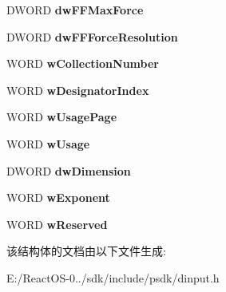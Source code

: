 \begin{DoxyCompactItemize}
D\+W\+O\+RD {\bfseries dw\+F\+F\+Max\+Force}
\item 
\mbox{\label{struct_d_i_d_e_v_i_c_e_o_b_j_e_c_t_i_n_s_t_a_n_c_e_w_a66ff7820923b0b9bd4690c436dd96df4}} 
D\+W\+O\+RD {\bfseries dw\+F\+F\+Force\+Resolution}
\item 
\mbox{\label{struct_d_i_d_e_v_i_c_e_o_b_j_e_c_t_i_n_s_t_a_n_c_e_w_aac38309e13ae6ffa946d108e3518ebff}} 
W\+O\+RD {\bfseries w\+Collection\+Number}
\item 
\mbox{\label{struct_d_i_d_e_v_i_c_e_o_b_j_e_c_t_i_n_s_t_a_n_c_e_w_ace891758c10c2a5d1977964a2cff74eb}} 
W\+O\+RD {\bfseries w\+Designator\+Index}
\item 
\mbox{\label{struct_d_i_d_e_v_i_c_e_o_b_j_e_c_t_i_n_s_t_a_n_c_e_w_a6582de6cd65e43702101065ff405be50}} 
W\+O\+RD {\bfseries w\+Usage\+Page}
\item 
\mbox{\label{struct_d_i_d_e_v_i_c_e_o_b_j_e_c_t_i_n_s_t_a_n_c_e_w_a288c9b0faab95ea398b2b947a8d19dac}} 
W\+O\+RD {\bfseries w\+Usage}
\item 
\mbox{\label{struct_d_i_d_e_v_i_c_e_o_b_j_e_c_t_i_n_s_t_a_n_c_e_w_acbe2d38d1a76578c805c52b167c05481}} 
D\+W\+O\+RD {\bfseries dw\+Dimension}
\item 
\mbox{\label{struct_d_i_d_e_v_i_c_e_o_b_j_e_c_t_i_n_s_t_a_n_c_e_w_aabc74cbb26f0e29e739bec9ecec222d4}} 
W\+O\+RD {\bfseries w\+Exponent}
\item 
\mbox{\label{struct_d_i_d_e_v_i_c_e_o_b_j_e_c_t_i_n_s_t_a_n_c_e_w_ad0ad1abadf848085f28fb14506996b09}} 
W\+O\+RD {\bfseries w\+Reserved}
\end{DoxyCompactItemize}


该结构体的文档由以下文件生成\+:\begin{DoxyCompactItemize}
\item 
E\+:/\+React\+O\+S-\/0../sdk/include/psdk/dinput.\+h\end{DoxyCompactItemize}

